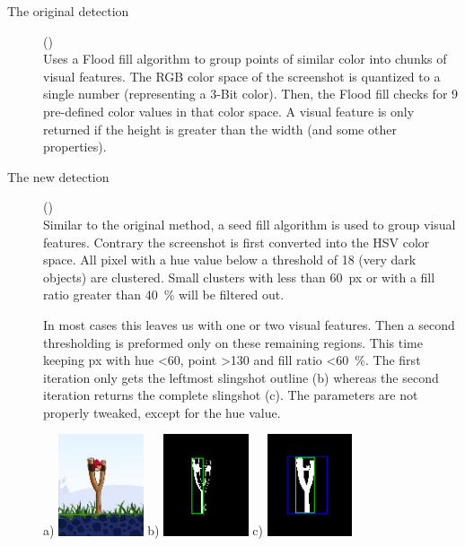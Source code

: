 \begin{description}
	\item[The original detection]()\\
	Uses a Flood fill algorithm to group points of similar color into chunks of visual features. The RGB color space of the screenshot is quantized to a single number (representing a 3-Bit color). Then, the Flood fill checks for \num{9} pre-defined color values in that color space. A visual feature is only returned if the height is greater than the width (and some other properties).
	
	\item[The new detection]()\\
	Similar to the original method, a seed fill algorithm is used to group visual features. Contrary the screenshot is first converted into the HSV color space. All pixel with a hue value below a threshold of \num{18} (very dark objects) are clustered. Small clusters with less than \SI{60}{px} or with a fill ratio greater than \SI{40}{\%} will be filtered out.
	
	In most cases this leaves us with one or two visual features. Then a second thresholding is preformed only on these remaining regions. This time keeping px with hue \num{<60}, point \num{>130} and fill ratio \SI{<60}{\%}. The first iteration only gets the leftmost slingshot outline (b) whereas the second iteration returns the complete slingshot (c). The parameters are not properly tweaked, except for the hue value.
	
	\begin{center}
	a) \includegraphics[height=3cm]{img/sling_detection_1}
	b) \includegraphics[height=3cm]{img/sling_detection_2}
	c) \includegraphics[height=3cm]{img/sling_detection_3}
	\end{center}
	

\end{description}
